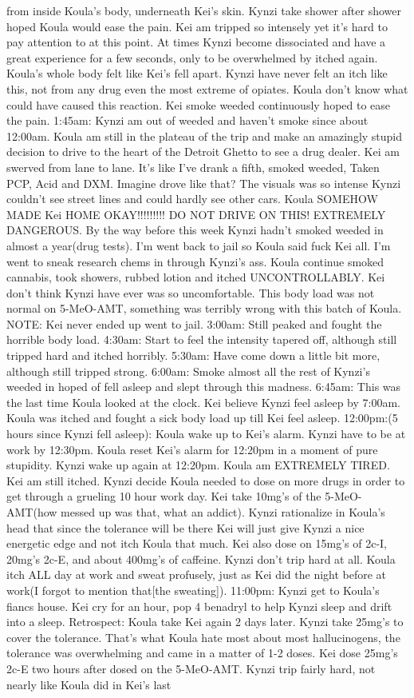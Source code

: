 \documentclass[12pt]{book}
\begin{document}
from inside Koula's body, underneath Kei's skin. Kynzi take shower after shower hoped Koula would ease the pain. Kei am tripped so intensely yet it's hard to pay attention to at this point. At times Kynzi become dissociated and have a great experience for a few seconds, only to be overwhelmed by itched again. Koula's whole body felt like Kei's fell apart. Kynzi have never felt an itch like this, not from any drug even the most extreme of opiates. Koula don't know what could have caused this reaction. Kei smoke weeded continuously hoped to ease the pain. 1:45am: Kynzi am out of weeded and haven't smoke since about 12:00am. Koula am still in the plateau of the trip and make an amazingly stupid decision to drive to the heart of the Detroit Ghetto to see a drug dealer. Kei am swerved from lane to lane. It's like I've drank a fifth, smoked weeded, Taken PCP, Acid and DXM. Imagine drove like that? The visuals was so intense Kynzi couldn't see street lines and could hardly see other cars. Koula SOMEHOW MADE Kei HOME OKAY!!!!!!!!! DO NOT DRIVE ON THIS! EXTREMELY DANGEROUS. By the way before this week Kynzi hadn't smoked weeded in almost a year(drug tests). I'm went back to jail so Koula said fuck Kei all. I'm went to sneak research chems in through Kynzi's ass. Koula continue smoked cannabis, took showers, rubbed lotion and itched UNCONTROLLABLY. Kei don't think Kynzi have ever was so uncomfortable. This body load was not normal on 5-MeO-AMT, something was terribly wrong with this batch of Koula. NOTE: Kei never ended up went to jail. 3:00am: Still peaked and fought the horrible body load. 4:30am: Start to feel the intensity tapered off, although still tripped hard and itched horribly. 5:30am: Have come down a little bit more, although still tripped strong. 6:00am: Smoke almost all the rest of Kynzi's weeded in hoped of fell asleep and slept through this madness. 6:45am: This was the last time Koula looked at the clock. Kei believe Kynzi feel asleep by 7:00am. Koula was itched and fought a sick body load up till Kei feel asleep. 12:00pm:(5 hours since Kynzi fell asleep): Koula wake up to Kei's alarm. Kynzi have to be at work by 12:30pm. Koula reset Kei's alarm for 12:20pm in a moment of pure stupidity. Kynzi wake up again at 12:20pm. Koula am EXTREMELY TIRED. Kei am still itched. Kynzi decide Koula needed to dose on more drugs in order to get through a grueling 10 hour work day. Kei take 10mg's of the 5-MeO-AMT(how messed up was that, what an addict). Kynzi rationalize in Koula's head that since the tolerance will be there Kei will just give Kynzi a nice energetic edge and not itch Koula that much. Kei also dose on 15mg's of 2c-I, 20mg's 2c-E, and about 400mg's of caffeine. Kynzi don't trip hard at all. Koula itch ALL day at work and sweat profusely, just as Kei did the night before at work(I forgot to mention that[the sweating]). 11:00pm: Kynzi get to Koula's fiancs house. Kei cry for an hour, pop 4 benadryl to help Kynzi sleep and drift into a sleep. Retrospect: Koula take Kei again 2 days later. Kynzi take 25mg's to cover the tolerance. That's what Koula hate most about most hallucinogens, the tolerance was overwhelming and came in a matter of 1-2 doses. Kei dose 25mg's 2c-E two hours after dosed on the 5-MeO-AMT. Kynzi trip fairly hard, not nearly like Koula did in Kei's last 
\end{document}
